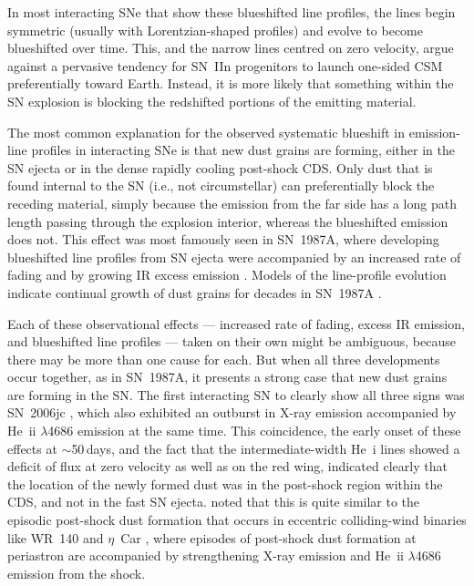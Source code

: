 \documentclass[fleqn,usenatbib,useAMS]{mnras}
\begin{document}

In most interacting SNe that show these blueshifted line profiles, the
lines begin symmetric (usually with Lorentzian-shaped profiles) and
evolve to become blueshifted over time. This, and the narrow
lines centred on zero velocity, argue against a pervasive tendency
for SN~IIn progenitors to launch one-sided CSM preferentially toward
Earth.  Instead, it is more likely that something within the SN
explosion is blocking the redshifted portions of the emitting
material.

The most common explanation for the observed systematic blueshift in
emission-line profiles in interacting SNe is that new dust
grains are forming, either in the SN ejecta or in the dense rapidly
cooling post-shock CDS.  Only dust that is found internal
to the SN (i.e., not circumstellar) can preferentially block the
receding material, simply because the emission from the far side has a
long path length passing through the explosion interior,
whereas the blueshifted emission does not.  This effect was most
famously seen in SN~1987A, where developing blueshifted line
profiles from SN ejecta were accompanied by an increased rate of fading
and by growing IR excess emission
\citep{danziger89,lucy89,gn90,wooden93,colgan94}.  Models of the line-profile evolution indicate continual growth of dust grains for decades
in  SN~1987A \citep{bevan16}.  

Each of these observational effects --- increased rate of fading, excess IR
 emission, and blueshifted line profiles --- taken on their own
might be ambiguous, because there may be more than one cause for each.
But when all three developments occur together, as in SN~1987A, it
presents a strong case that new dust grains are forming in the SN.
The first interacting SN to clearly show all three signs was SN~2006jc
\citep{smith08jc}, which also exhibited an outburst in X-ray emission
\citep{immler08} accompanied by He~{\sc ii} $\lambda$4686 emission at the same
time.  This coincidence, the early onset of these effects at $\sim$50\,days, and the fact that the intermediate-width He~{\sc i} lines showed
a deficit of flux at zero velocity as well as on the red wing,
indicated clearly that the location of the newly formed dust was in the
post-shock region within the CDS, and not in the fast SN ejecta.
\citet{smith08jc} noted that this is quite similar to the 
episodic post-shock dust formation that occurs in eccentric 
colliding-wind binaries like WR~140 \citep{hgg79,williams90,monnier02} and
$\eta$~Car \citep{smith10eta}, where episodes of post-shock dust
formation at periastron are accompanied by strengthening X-ray
emission and He~{\sc ii} $\lambda$4686 emission from the shock.
\end{document}

